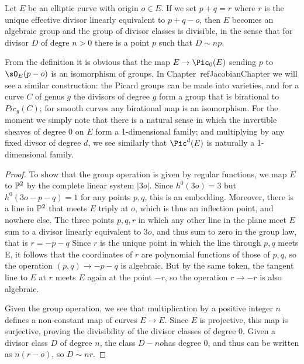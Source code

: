 \begin{proposition}\label{group law} Let $E$ be an elliptic curve with origin $o\in E$.
If we set $p+q = r$ where $r$ is the unique effective divisor linearly equivalent to $p+q-o$, then $E$ becomes an algebraic group
and the group of divisor classes is divisible, in the sense that for divisor $D$ of degre $n>0$
 there is a point $p$ such that $D\sim np$.
 \end{proposition}

\begin{remark}
From the definition it is obvious that 
the map
$E \to \Pic_0(E)$ sending $p$ to $\sO_E(p-o)$ is an isomorphism of groups.
 In Chapter~ref{JacobianChapter} we will see a similar construction: the Picard groups can be made into
varieties, and for a curve $C$ of genus $g$ the divisors
of degree $g$ form a group that is birational to $Pic_g(C)$; for smooth curves any birational map is an isomorphism.
For the moment we simply note that there is a natural sense in which the invertible sheaves of degree 0 on $E$
form a 1-dimensional family; and multiplying by any fixed divsor of degree $d$, we see similarly
that $\Pic^d(E)$ is naturally a 1-dimensional family. 
\end{remark}
 
\begin{proof}
To show that the group operation is given by regular functions, we map $E$ to $\PP^2$ by the complete linear system $|3o|$. Since
$h^0(3o) = 3$ but $h^0(3o-p-q) = 1$ for any points $p,q$, this is an embedding. Moreover, there is a line in $\PP^2$ that meets
$E$ triply at $o$, which is thus an inflection point, and nowhere else. The three points $p,q,r$ in which any other line in the plane
meet $E$ sum to a divisor linearly equivalent to $3o$, and thus sum to zero in the group law, that is $r = -p-q$ Since $r$ is the unique
point in which the line
through $p,q$ meets  E, it follows that the coordinates of $r$ are polynomial functions of those of $p,q$, so the operation
$(p,q) \to -p-q$ is algebraic. But by the same token, the tangent line to $E$ at $r$ meets $E$ again at the point $-r$,
so the operation $r\to -r$ is also algebraic.

Given the group operation, we see that multiplication by a positive integer $n$ defines a non-constant map of 
curves $E\to E$. Since $E$ is projective, this map is surjective, proving the divisibility of the divisor classes of degree 0. 
Given a divisor class $D$ of degree $n$, the class $D -no$has degree 0, and thus can be written as $n(r-o)$, so
$D\sim nr$.
\end{proof}


